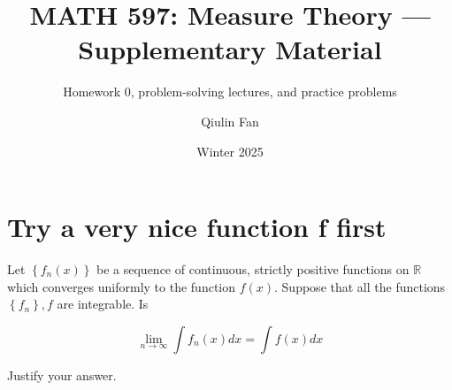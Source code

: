 \documentclass{qlnotes-export}
\title{MATH 597: Measure Theory --- Supplementary Material}
\subtitle{Homework 0, problem-solving lectures, and practice problems}
\author{Qiulin Fan}
\date{Winter 2025}
\begin{document}
\mainmatter
\chapter{Try a very nice function f first}\label{try-a-very-nice-function-f-first}

Let \(\left\{ {f_{n}(x)} \right\}\) be a sequence of continuous, strictly positive functions on \(\mathbb{R}\) which converges uniformly to the function \(f(x)\). Suppose that all the functions \(\left\{ f_{n} \right\},f\) are integrable. Is

\[\lim\limits_{n\rightarrow\infty}\int f_{n}(x)dx = \int f(x)dx\]

Justify your answer.
\end{document}
